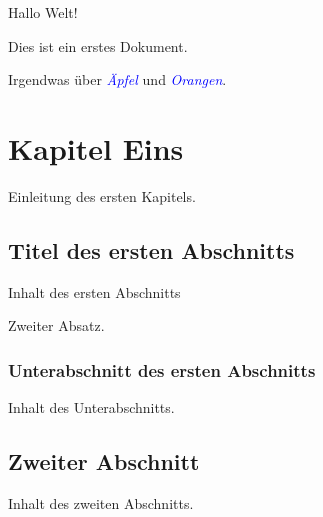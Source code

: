 \documentclass[twocolumn]{book}
\newcommand\kw[1]{\textcolor{blue}{\itshape{#1}\/}} %
\begin{document}
Hallo Welt!

Dies ist ein erstes Dokument.

Irgendwas über \kw{Äpfel} und \kw{Orangen}.

\lipsum{}

\chapter{Kapitel Eins}
Einleitung des ersten Kapitels.


\section{Titel des ersten Abschnitts}
Inhalt des ersten Abschnitts

Zweiter Absatz.

\subsection{Unterabschnitt des ersten Abschnitts}

Inhalt des Unterabschnitts.


\section{Zweiter Abschnitt}

Inhalt des zweiten Abschnitts.
\end{document}

